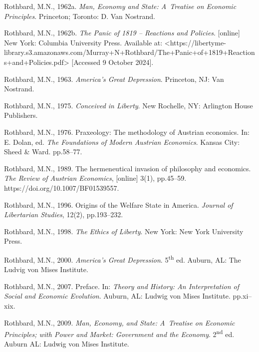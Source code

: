 Rothbard, M.N., 1962a. \textit{Man, Economy and State: A~Treatise on Economic Principles}. Princeton; Toronto: D. Van Nostrand.



Rothbard, M.N., 1962b. \textit{The Panic of 1819 -- Reactions and Policies}. [online] New York: Columbia University Press. Available at: {\textless}https://libertyme-library.s3.amazonaws.com/Murray+N+Rothbard/The+Panic+of+1819+Reactions+and+Policies.pdf{\textgreater} [Accessed 9 October 2024].



Rothbard, M.N., 1963. \textit{America's Great Depression}. Princeton, NJ: Van Nostrand.



Rothbard, M.N., 1975. \textit{Conceived in Liberty}. New Rochelle, NY: Arlington House Publishers.



Rothbard, M.N., 1976. Praxeology: The methodology of Austrian economics. In: E. Dolan, ed. \textit{The Foundations of Modern Austrian Economics}. Kansas City: Sheed \& Ward. pp.58–77.



Rothbard, M.N., 1989. The hermeneutical invasion of philosophy and economics. \textit{The Review of Austrian Economics}, [online] 3(1), pp.45–59. https://doi.org/10.1007/BF01539557.



Rothbard, M.N., 1996. Origins of the Welfare State in America. \textit{Journal of Libertarian Studies}, 12(2), pp.193–232.



Rothbard, M.N., 1998. \textit{The Ethics of Liberty}. New York: New York University Press.



Rothbard, M.N., 2000. \textit{America's Great Depression}. 5\textsuperscript{th} ed. Auburn, AL: The Ludvig von Mises Institute.



Rothbard, M.N., 2007. Preface. In: \textit{Theory and History: An Interpretation of Social and Economic Evolution}. Auburn, AL: Ludwig von Mises Institute. pp.xi–xix.



Rothbard, M.N., 2009. \textit{Man, Economy, and State: A~Treatise on Economic Principles; with Power and Market: Government and the Economy}. 2\textsuperscript{nd} ed. Auburn AL: Ludwig von Mises Institute.



